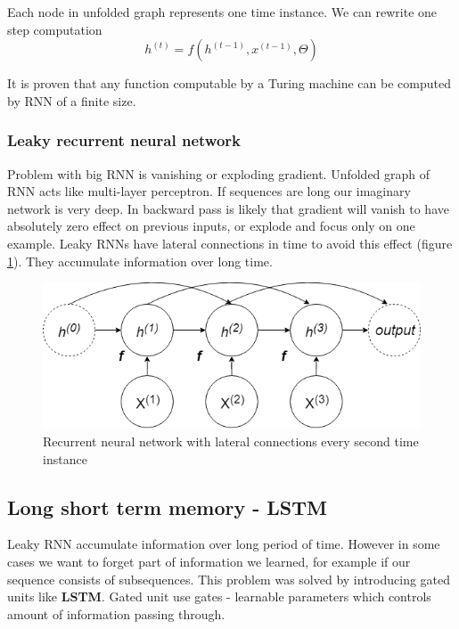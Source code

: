 Each node in unfolded graph represents one time instance. We can rewrite one step computation
$$ h^{(t)} = f(h^{(t-1)}, x^{(t-1)}, \Theta)$$

It is proven that any function computable by a Turing machine can be computed by RNN of a finite size.

\subsubsection{Leaky recurrent neural network}

Problem with big RNN is vanishing or exploding gradient. Unfolded graph of RNN acts like multi-layer perceptron. If sequences are long our imaginary network is very deep. In backward pass is likely that gradient will vanish to have absolutely zero effect on previous inputs, or explode and focus only on one example. Leaky RNNs have lateral connections in time to avoid this effect (figure \ref{fig:RNN_lateral}). They accumulate information over long time.  

\begin{figure}[!h]
    \centering
    \includegraphics[width=140mm]{chapters/images/RNN_leaky.png}
    \caption{Recurrent neural network with lateral connections every second time instance }
    \label{fig:RNN_lateral}
\end{figure}

\subsection{Long short term memory - LSTM}

Leaky RNN accumulate information over long period of time. However in some cases we want to forget part of information we learned, for example if our sequence consists of subsequences. This problem was solved by introducing gated units like \textbf{LSTM}. Gated unit use gates - learnable parameters which controls amount of information passing through. 


